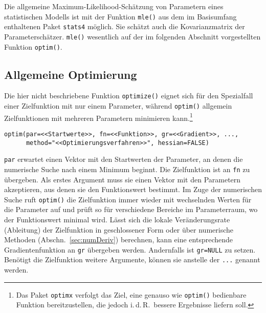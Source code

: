 Die allgemeine Maximum-Likelihood-Schätzung von Parametern eines statistischen Modells ist mit der Funktion \lstinline!mle()! aus dem im Basisumfang enthaltenen Paket \lstinline!stats4! möglich. Sie schätzt auch die Kovarianzmatrix der Parameterschätzer. \lstinline!mle()! wesentlich auf der im folgenden Abschnitt vorgestellten Funktion \lstinline!optim()!.

\subsection{Allgemeine Optimierung}
\label{sec:optimize}

Die hier nicht beschriebene Funktion \lstinline!optimize()! eignet sich für den Spezialfall einer Zielfunktion mit nur einem Parameter, während \lstinline!optim()! allgemein Zielfunktionen mit mehreren Parametern minimieren kann.\footnote{Das Paket \lstinline!optimx! \cite{Nash2011} verfolgt das Ziel, eine genauso wie \lstinline!optim()! bedienbare Funktion bereitzustellen, die jedoch i.\,d.\,R.\ bessere Ergebnisse liefern soll.}
\begin{lstlisting}
optim(par=<<Startwerte>>, fn=<<Funktion>>, gr=<<Gradient>>, ...,
      method="<<Optimierungsverfahren>>", hessian=FALSE)
\end{lstlisting}

\lstinline!par! erwartet einen Vektor mit den Startwerten der Parameter, an denen die numerische Suche nach einem Minimum beginnt. Die Zielfunktion ist an \lstinline!fn! zu übergeben. Als erstes Argument muss sie einen Vektor mit den Parametern akzeptieren, aus denen sie den Funktionswert bestimmt. Im Zuge der numerischen Suche ruft \lstinline!optim()! die Zielfunktion immer wieder mit wechselnden Werten für die Parameter auf und prüft so für verschiedene Bereiche im Parameterraum, wo der Funktionswert minimal wird. Lässt sich die lokale Veränderungsrate (Ableitung) der Zielfunktion in geschlossener Form oder über numerische Methoden (Abschn.\ \ref{sec:numDeriv}) berechnen, kann eine entsprechende Gradientenfunktion an \lstinline!gr! übergeben werden. Andernfalls ist \lstinline!gr=NULL! zu setzen. Benötigt die Zielfunktion weitere Argumente, können sie anstelle der \lstinline!...! genannt werden.


